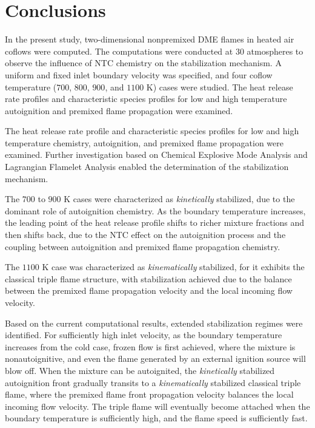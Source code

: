 \documentclass[review,3p,times]{elsarticle}
\begin{document}
\section{Conclusions}

In the present study, two-dimensional nonpremixed DME flames in heated air coflows were computed.  The computations were conducted at $30$ atmospheres to observe the influence of NTC chemistry on the stabilization mechanism.  A uniform and fixed inlet boundary velocity was specified, and four coflow temperature ($700$, $800$, $900$, and $1100$ K) cases were studied.  The heat release rate profiles and characteristic species profiles for low and high temperature autoignition and premixed flame propagation were examined.


The heat release rate profile and characteristic species profiles for low and high temperature chemistry, autoignition, and premixed flame propagation were examined.  Further investigation based on Chemical Explosive Mode Analysis and Lagrangian Flamelet Analysis enabled the determination of the stabilization mechanism.  

The $700$ to $900$ K cases were characterized as \emph {kinetically} stabilized, due to the dominant role of autoignition chemistry.  As the boundary temperature increases, the leading point of the heat release profile shifts to richer mixture fractions and then shifts back, due to the NTC effect on the autoignition process and the coupling between autoignition and premixed flame propagation chemistry.  

The $1100$ K case was characterized as \emph {kinematically} stabilized, for it exhibits the classical triple flame structure, with stabilization achieved due to the balance between the premixed flame propagation velocity and the local incoming flow velocity.

Based on the current computational results, extended stabilization regimes were identified.  For sufficiently high inlet velocity, as the boundary temperature increases from the cold case, frozen flow is first achieved, where the mixture is nonautoignitive, and even the flame generated by an external ignition source will blow off.  When the mixture can be autoignited, the \emph {kinetically} stabilized autoignition front gradually transits to a \emph {kinematically} stabilized classical triple flame, where the premixed flame front propagation velocity balances the local incoming flow velocity.  The triple flame will eventually become attached when the boundary temperature is sufficiently high, and the flame speed is sufficiently fast.
\end{document}
